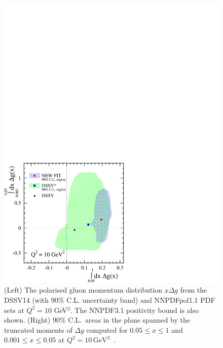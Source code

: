 \begin{figure}[!t]
\vspace*{-15.1cm}
\hspace*{8cm}
\includegraphics[scale=0.555]{plots/correlation_getot.pdf}

\caption{(Left) The polarised gluon momentum distribution  $x\Delta g$ from the 
DSSV14 (with $90\%$ C.L. uncertainty band)
and NNPDFpol1.1 PDF sets at $Q^2=10$ GeV$^2$. The NNPDF3.1 positivity
bound is also shown.
(Right) $90\%$ C.L.\ areas in the plane spanned by the truncated moments of
$\Delta g$ computed for $0.05\leq x\leq 1$ and $0.001\leq x\leq 0.05$ at $Q^2=10\,\mathrm{GeV}^2$~\cite{deFlorian:2014yva}.}
\label{fig:RHICpdfs}
\end{figure}

